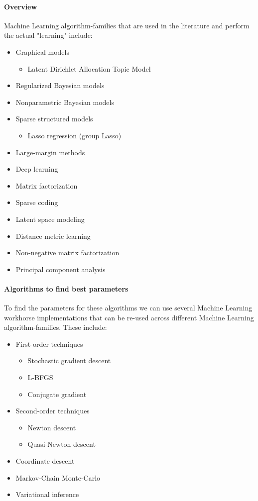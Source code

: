 \paragraph{Overview}
Machine Learning algorithm-families that are used in the literature and perform the actual "learning" include:
\begin{itemize}
	\item Graphical models \cite{Wain08}\cite{Kol09}\cite{Xin16}
	\begin{itemize}
		\item Latent Dirichlet Allocation Topic Model \cite{Blei03}
	\end{itemize}
	\item Regularized Bayesian models \cite{Zhu09}\cite{Zhu09-2}\cite{Zhu14}
	\item Nonparametric Bayesian models \cite{Grif05}\cite{Teh06}
	\item Sparse structured models
	\begin{itemize}
		\item Lasso regression (group Lasso)
	\end{itemize}
	\item Large-margin methods
	\item Deep learning
	\item Matrix factorization
	\item Sparse coding
	\item Latent space modeling
	\item Distance metric learning
	\item Non-negative matrix factorization
	\item Principal component analysis
\end{itemize}


\paragraph{Algorithms to find best parameters}
To find the parameters for these algorithms we can use several Machine Learning workhorse implementations that can be re-used across different Machine Learning algorithm-families. These include:
\begin{itemize}
	\item First-order techniques
	\begin{itemize}
		\item Stochastic gradient descent
		\item L-BFGS
		\item Conjugate gradient
	\end{itemize}
	\item Second-order techniques
	\begin{itemize}
		\item Newton descent
		\item Quasi-Newton descent
	\end{itemize}
	\item Coordinate descent
	\item Markov-Chain Monte-Carlo
	\item Variational inference
\end{itemize}



